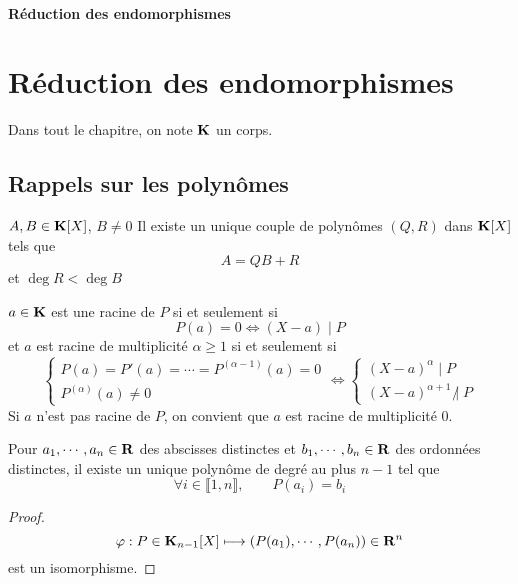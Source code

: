 \ifsolo
    ~

    \vspace{1cm}

    \begin{center}
        \textbf{\LARGE Réduction des endomorphismes} \\[1em]
    \end{center}
    \tableofcontents
\else
    \chapter{Réduction des endomorphismes}

    \minitoc
\fi
\thispagestyle{empty}

\ifsolo \newpage \setcounter{page}{1} \fi

Dans tout le chapitre, on note $\mathbf K$ un corps.

\section{Rappels sur les polynômes}

\begin{thm}
    \Hyp $A, B\in \mathbf K[X]$, $B\neq 0$
    \Conc Il existe un unique couple de polynômes $(Q, R)$ dans $\mathbf K[X]$ tels que \[
        A=QB+R
    \]
    et $\deg R<\deg B$
\end{thm}

\begin{thmdef}
    $a\in\mathbf K$ est une racine de $P$ si et seulement si \[
    P(a)=0\iff (X-a)\;|\;P
\]
et $a$ est racine de multiplicité $\alpha \geq 1$ si et seulement si \[
    \begin{cases}
        P(a)=P'(a)=\cdots=P^{(\alpha - 1)}(a)=0 \\
        P^{(\alpha)}(a)\neq 0
    \end{cases}
    \iff \begin{cases}
        (X-a)^\alpha \; |\; P\\
        (X-a)^{\alpha+1}\;\not|\;P
    \end{cases}
\]
Si $a$ n'est pas racine de $P$, on convient que $a$ est racine de multiplicité $0$.
\end{thmdef}

\begin{thm}
     Pour $a_1, \cdots, a_n\in\mathbf R$ des abscisses distinctes et $b_1, \cdots, b_n\in\mathbf R$ des ordonnées distinctes, il existe un unique polynôme de degré au plus $n-1$ tel que \[
        \forall i\in\llbracket 1, n\rrbracket, \qquad P(a_i)=b_i
    \]
\end{thm}
\begin{proof}
    \[
        \varphi:P\in\mathbf K_{n-1}[X]\longmapsto (P(a_1), \cdots, P(a_n))\in\mathbf R^n
    \]
    est un isomorphisme.
\end{proof}

